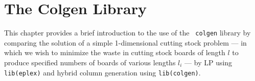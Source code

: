 %
% 
% 
% 
% 

\chapter{The Colgen Library}
\label{chapcolgen}

\enableunderscores
This chapter provides a brief introduction to the use of the {\tt
colgen} library by comparing the solution of a simple
1-dimensional cutting stock problem --- in which we wish to minimize
the waste in cutting stock boards of length $l$ to produce specified
numbers of boards of various lengths ${l}_{i}$ --- by LP using {\tt lib(eplex)} and
hybrid column generation using {\tt lib(colgen)}.
